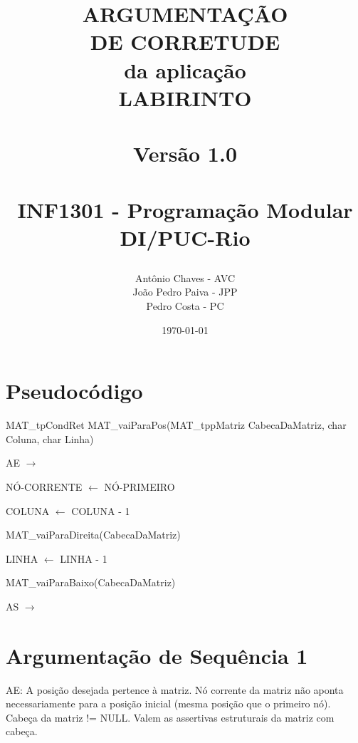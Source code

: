\documentclass[a4paper,12pt,oneside]{book}
\title{
  \begin{flushright}
  \Huge{ARGUMENTAÇÃO \\ DE CORRETUDE}\\
  da aplicação\\
  LABIRINTO\\
  ~\\
  \LARGE{Versão 1.0}\\
  ~\\
  INF1301 - Programação Modular\\ DI/PUC-Rio
  \end{flushright}
}
\author{Antônio Chaves - AVC\\João Pedro Paiva - JPP\\Pedro Costa - PC}
\date{\today}
\begin{document}
\setlength{\parindent}{0in}

\setlength{\parskip}{\baselineskip}


\frontmatter
\maketitle

\tableofcontents



\mainmatter

\chapter{Pseudocódigo}

\begin{algorithm}[h]

    \caption{MAT\_tpCondRet MAT\_vaiParaPos(MAT\_tppMatriz CabecaDaMatriz, char Coluna, char Linha)}

    \SetAlgoLined
    AE $\longrightarrow$

    \Indp\Inicio
    {

        NÓ-CORRENTE $\longleftarrow$ NÓ-PRIMEIRO

        {

            COLUNA $\longleftarrow$ COLUNA - 1

            MAT\_vaiParaDireita(CabecaDaMatriz)
        }

        {

            LINHA $\longleftarrow$ LINHA - 1

            MAT\_vaiParaBaixo(CabecaDaMatriz)
        }


    }

    \Indm AS $\longrightarrow$

\end{algorithm}

\chapter{Argumentação de Sequência 1}

AE: A posição desejada pertence à matriz. Nó corrente da matriz não aponta necessariamente para a posição inicial (mesma posição que o primeiro nó). Cabeça da matriz != NULL. Valem as assertivas estruturais da matriz com cabeça.
\end{document}

